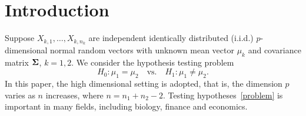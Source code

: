 \documentclass[times,sort&compress,3p]{elsarticle}
\theoremstyle{plain}
\theoremstyle{definition}
\theoremstyle{remark}
\begin{document}



\section{Introduction}
\nocite{*}

Suppose $X_{k,1},\ldots,X_{k,n_k}$  are independent identically distributed (i.i.d.) $p$-dimensional normal random vectors with unknown mean vector $\mu_k$ and covariance matrix $\boldsymbol{\Sigma}$, $k=1,2$. We consider the hypothesis testing problem
\begin{equation}\label{problem}
    H_0:\mu_1=\mu_2\quad \textrm{vs.}\quad H_1:\mu_1\neq \mu_2.
\end{equation}
 In this paper, {the} high dimensional setting is adopted, that is, the dimension $p$ varies as $n$ increases, where $n=n_1+n_2-2$.
Testing hypotheses~\eqref{problem} is important in many fields, including biology, finance and economics.
\end{document}
